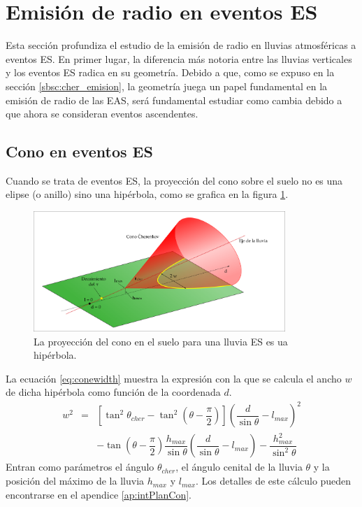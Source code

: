 \section{Emisi\'on de radio en eventos ES}
\label{sc:toymodel}
	
	
	Esta secci\'on profundiza el estudio de la emisi\'on de radio en lluvias atmosf\'ericas a eventos ES. 
	En primer lugar, la diferencia m\'as notoria entre las lluvias verticales y los eventos ES radica en su geometr\'ia.
	Debido a que, como se expuso en la secci\'on \ref{sbsc:cher_emision}, la geometr\'ia juega un papel fundamental en la emisi\'on de radio de las EAS, ser\'a fundamental estudiar como cambia debido a que ahora se consideran eventos ascendentes.
	
	\subsection{Cono \cher{} en eventos ES}
	\label{sbsc:conoEs}
	
	Cuando se trata de eventos ES, la proyección del cono \cher{} sobre el suelo no es una elipse (o anillo) sino una hipérbola, como se grafica en la figura \ref{fig:chConeES}.
	\begin{figure}[ht!]
	\centering
		\includegraphics[width=0.85\textwidth]{fig/EASRadio/coneProy}
		\caption{\label{fig:chConeES} La proyección del cono en el suelo para una lluvia ES es ua hip\'erbola.}
	\end{figure}
	La ecuación \ref{eq:conewidth} muestra la expresión con la que se calcula el ancho $w$ de dicha hip\'erbola como función de la coordenada $d$.
	\begin{equation}
	\renewcommand{\arraystretch}{2.5}
	\begin{array}{rcl}
	w^2&=& \left[\tan^2 \theta_{cher}-\tan^2 \left(\theta-\dfrac{\pi}{2}\right)\right]
	\left(\dfrac{d}{\sin \theta}-l_{max}\right)^2\\
	& & - \tan \left(\theta-\dfrac{\pi}{2}\right) \dfrac{h_{max}}{\sin \theta}
	\left(\dfrac{d}{\sin \theta}-l_{max}\right)
	- \dfrac{h_{max}^2}{\sin^2 \theta}
	\end{array}
	\label{eq:conewidth}
	\end{equation}
	Entran como parámetros el ángulo \cher{} $\theta_{cher}$, el ángulo cenital de la lluvia $\theta$ y la posición del máximo de la lluvia $h_{max}$ y $l_{max}$.
	Los detalles de este cálculo pueden encontrarse en el apendice \ref{ap:intPlanCon}.
	
